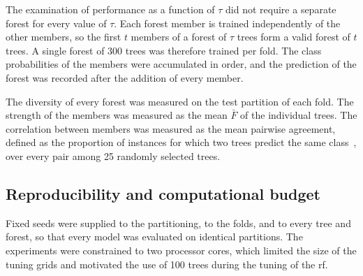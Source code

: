 The examination of performance as a function of $\tau$ did not require a
separate forest for every value of $\tau$. Each forest member is trained
independently of the other members, so the first $t$ members of a forest of
$\tau$ trees form a valid forest of $t$ trees. A single forest of 300 trees
was therefore trained per fold. The class probabilities of the members were
accumulated in order, and the prediction of the forest was recorded after
the addition of every member.

The diversity of every forest was measured on the test partition of each
fold. The strength of the members was measured as the mean $\bar{F}$ of the
individual trees. The correlation between members was measured as the mean
pairwise agreement, defined as the proportion of instances for which two
trees predict the same class~\cite{kuncheva2003}, over every pair among 25
randomly selected trees.

\subsection{Reproducibility and computational budget}

Fixed seeds were supplied to the partitioning, to the folds, and to every
tree and forest, so that every model was evaluated on identical partitions.
The experiments were constrained to two processor cores, which limited the
size of the tuning grids and motivated the use of 100 trees during the
tuning of the \gls{rf}.
